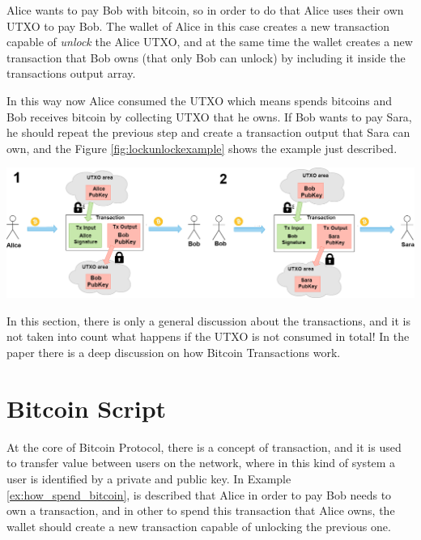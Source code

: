 \begin{example}
    \label{ex:how_spend_bitcoin}
    Alice wants to pay Bob with bitcoin, so in order to do that Alice
    uses their own UTXO to pay Bob. The wallet of Alice in this case creates a new transaction
    capable of \emph{unlock} the Alice UTXO, and at the same time the wallet creates 
    a new transaction that Bob owns (that only Bob can unlock) by including it inside the transactions output array. 

    In this way now Alice consumed the UTXO which means spends bitcoins and Bob receives bitcoin by collecting UTXO that he owns. 
    If Bob wants to pay Sara, he should repeat the previous step and create a transaction output that Sara can own,
    and the Figure \ref{fig:lockunlockexample} shows the example just described.

    {\centering
     \vspace{5pt}
      \includegraphics[scale=0.3]{imgs/DiagramUnlocLockUTXO.png}
      \vspace{10pt}
     \par}
\end{example}

In this section, there is only a general discussion about the transactions, and it is not taken into count
what happens if the UTXO is not consumed in total! In the paper \cite{Palazzo_Estrazione_di_Informazioni_2021}
there is a deep discussion on how Bitcoin Transactions work.

\section{Bitcoin Script}

At the core of Bitcoin Protocol, there is a concept of transaction, and it is used to transfer value
between users on the network, where in this kind of system a user is identified by a private and public key.
In Example \ref{ex:how_spend_bitcoin}, is described that Alice in order to pay Bob needs to 
own a transaction, and in other to spend this transaction that Alice owns, the wallet should
create a new transaction capable of unlocking the previous one. 

